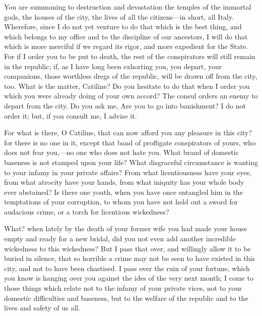 \documentclass[a4paper]{amsbook}
\begin{document}
You are summoning to destruction and devastation the temples of the immortal gods, the houses of the city, the lives of all the citizens—in short, all Italy. Wherefore, since I do not yet venture to do that which is the best thing, and which belongs to my office and to the discipline of our ancestors, I will do that which is more merciful if we regard its rigor, and more expedient for the State. For if I order you to be put to death, the rest of the conspirators will still remain in the republic; if, as I have long been exhorting you, you depart, your companions, those worthless dregs of the republic, will be drawn off from the city, too. What is the matter, Catiline? Do you hesitate to do that when I order you which you were already doing of your own accord? The consul orders an enemy to depart from the city. Do you ask me, Are you to go into banishment? I do not order it; but, if you consult me, I advise it.

For what is there, O Catiline, that can now afford you any pleasure in this city? for there is no one in it, except that band of profligate conspirators of yours, who does not fear you,—no one who does not hate you. What brand of domestic baseness is not stamped upon your life? What disgraceful circumstance is wanting to your infamy in your private affairs? From what licentiousness have your eyes, from what atrocity have your hands, from what iniquity has your whole body ever abstained? Is there one youth, when you have once entangled him in the temptations of your corruption, to whom you have not held out a sword for audacious crime, or a torch for licentious wickedness?

What? when lately by the death of your former wife you had made your house empty and ready for a new bridal, did you not even add another incredible wickedness to this wickedness? But I pass that over, and willingly allow it to be buried in silence, that so horrible a crime may not be seen to have existed in this city, and not to have been chastised. I pass over the ruin of your fortune, which you know is hanging over you against the ides of the very next month; I come to those things which relate not to the infamy of your private vices, not to your domestic difficulties and baseness, but to the welfare of the republic and to the lives and safety of us all.
\end{document}
